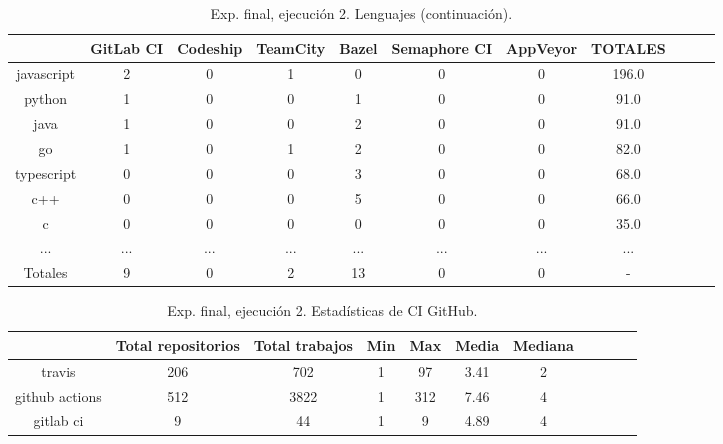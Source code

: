 \begin{table}
  \centering
  \caption{Exp. final, ejecución 2. Lenguajes (continuación).}
  \label{tab:tabla_f2_2b}

\begin{footnotesize}
\renewcommand{\arraystretch}{1.5} %
\begin{tabular}{ccccccccccc}
  \hline
  {} &  GitLab CI &  Codeship &  TeamCity &  Bazel &  Semaphore CI &  AppVeyor &  TOTALES \\
  \hline
  javascript    &        2 &         0 &         1 &      0 &             0 &         0 &    196.0 \\
  python        &        1 &         0 &         0 &      1 &             0 &         0 &     91.0 \\
  java          &        1 &         0 &         0 &      2 &             0 &         0 &     91.0 \\
  go            &        1 &         0 &         1 &      2 &             0 &         0 &     82.0 \\
  typescript    &        0 &         0 &         0 &      3 &             0 &         0 &     68.0 \\
  c++           &        0 &         0 &         0 &      5 &             0 &         0 &     66.0 \\
  c             &        0 &         0 &         0 &      0 &             0 &         0 &     35.0 \\
  ...           &      ... &       ... &       ... &    ... &           ... &       ... &      ... \\
  \hline
  Totales       &        9 &         0 &         2 &     13 &             0 &         0 &      - \\
 \end{tabular}
\end{footnotesize}

\end{table}

\begin{table}
  \centering
  \caption{Exp. final, ejecución 2. Estadísticas de CI GitHub.}
  \label{tab:tabla_f2_3}

\begin{footnotesize}
\renewcommand{\arraystretch}{1.5} %
\begin{tabular}{ccccccccccc}
  \hline
  {} &  Total repositorios &  Total trabajos &  Min &  Max &  Media &  Mediana \\
  \hline
  travis         &        206 &         702 &    1 &   97 &   3.41 &        2 \\
  github actions &        512 &        3822 &    1 &  312 &   7.46 &        4 \\
  gitlab ci      &          9 &          44 &    1 &    9 &   4.89 &        4 \\
 \end{tabular}
\end{footnotesize}

\end{table}

